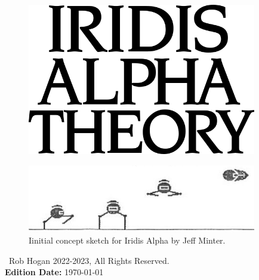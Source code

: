 
\vspace*{\fill}
\begin{figure}[H]
    \centering
      \includegraphics[width=10cm]{src/cover/title_page.png}%
\end{figure}
\vspace*{\fill}
\thispagestyle{empty}%

\clearpage
\vspace*{\fill}
\begin{figure}[H]
    \centering
      \includegraphics[width=10cm]{src/bumph/sketch.png}%
\caption*{Iinitial concept sketch for Iridis Alpha by Jeff Minter.}
\end{figure}

\vspace*{\fill}
\textcopyright\ Rob Hogan 2022-2023, All Rights Reserved. \\
\textbf{Edition Date:} \today

\doclicenseThis
\thispagestyle{empty}%
\clearpage
